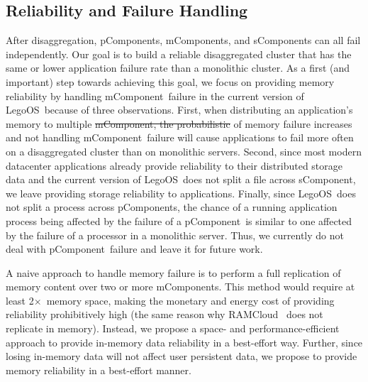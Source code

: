 \documentclass[10pt,times,twocolumn]{z2-article}
\newcommand{\x}{$\times$}
\newcommand{\lego}{LegoOS}
\newcommand{\pcomponent}{pComponent}
\newcommand{\mcomponent}{mComponent}
\newcommand{\scomponent}{sComponent}
\providecommand{\DIFaddtex}[1]{{\protect\color{blue}\uwave{#1}}} %
\providecommand{\DIFdeltex}[1]{{\protect\color{red}\sout{#1}}}                      %
\providecommand{\DIFaddbegin}{} %
\providecommand{\DIFaddend}{} %
\providecommand{\DIFdelbegin}{} %
\providecommand{\DIFdelend}{} %
\providecommand{\DIFadd}[1]{\texorpdfstring{\DIFaddtex{#1}}{#1}} %
\providecommand{\DIFdel}[1]{\texorpdfstring{\DIFdeltex{#1}}{}} %
\newcommand{\DIFscaledelfig}{0.5}
\newlength{\DIFdelgraphicswidth} %
\newlength{\DIFdelgraphicsheight} %
\newcommand{\DIFaddincludegraphics}[2][]{{\color{blue}\fbox{\DIFOincludegraphics[#1]{#2}}}} %
\newcommand{\DIFdelincludegraphics}[2][]{%
\sbox{\DIFdelgraphicsbox}{\DIFOincludegraphics[#1]{#2}}%
\settoboxwidth{\DIFdelgraphicswidth}{\DIFdelgraphicsbox} %
\settoboxtotalheight{\DIFdelgraphicsheight}{\DIFdelgraphicsbox} %
\scalebox{\DIFscaledelfig}{%
\parbox[b]{\DIFdelgraphicswidth}{\usebox{\DIFdelgraphicsbox}\\[-\baselineskip] \rule{\DIFdelgraphicswidth}{0em}}\llap{\resizebox{\DIFdelgraphicswidth}{\DIFdelgraphicsheight}{%
\setlength{\unitlength}{\DIFdelgraphicswidth}%
\begin{picture}(1,1)%
\thicklines\linethickness{2pt} %
{\color[rgb]{1,0,0}\put(0,0){\framebox(1,1){}}}%
{\color[rgb]{1,0,0}\put(0,0){\line( 1,1){1}}}%
{\color[rgb]{1,0,0}\put(0,1){\line(1,-1){1}}}%
\end{picture}%
}\hspace*{3pt}}} %
} %
\DeclareRobustCommand{\DIFaddbegin}{\DIFOaddbegin \let\includegraphics\DIFaddincludegraphics} %
\DeclareRobustCommand{\DIFaddend}{\DIFOaddend \let\includegraphics\DIFOincludegraphics} %
\DeclareRobustCommand{\DIFdelbegin}{\DIFOdelbegin \let\includegraphics\DIFdelincludegraphics} %
\DeclareRobustCommand{\DIFdelend}{\DIFOaddend \let\includegraphics\DIFOincludegraphics} %
\begin{document}
{{{{{{{\subsection{Reliability and Failure Handling}
\label{sec:failure}
After disaggregation, \pcomponent{}s, \mcomponent{}s, and \scomponent{}s can all fail independently.
Our goal is to build a reliable disaggregated cluster that has the same or lower application failure rate
than a monolithic cluster.
As a first (and important) step towards achieving this goal, %
we focus on providing memory reliability by handling \mcomponent\ failure in the current version of \lego\ because of three observations.
First, when distributing an application's memory to multiple \DIFdelbegin \DIFdel{\mcomponent, 
the probabilistic }\DIFdelend \DIFaddbegin \DIFadd{\mcomponent{}s, 
the probability }\DIFaddend of memory failure increases and not handling \mcomponent\ failure will cause applications to fail more often 
on a disaggregated cluster than on monolithic servers.
Second, since most modern datacenter applications
already provide reliability to their distributed storage data %
and the current version of \lego\ does not split a file across \scomponent,
we leave providing storage reliability to applications.
Finally, since \lego\ does not split a process across \pcomponent{}s,
the chance of a running application process being affected by the failure of a \pcomponent\ is similar to 
one affected by the failure of a processor in a monolithic server.
Thus, we currently do not deal with \pcomponent\ failure and leave it for future work.

A naive approach to handle memory failure is to perform a full replication of memory content over two or more \mcomponent{}s.
This method would require at least 2\x\ memory space,
making the monetary and energy cost of providing reliability prohibitively high (the same reason why RAMCloud~\cite{Ongaro11-RamCloud} does not replicate in memory).
Instead, we propose a space- and performance-efficient approach to provide in-memory data reliability in a best-effort way.
Further, since losing in-memory data will not affect user persistent data,
we propose to provide memory reliability in a best-effort manner.

}}}}}}}
\end{document}
